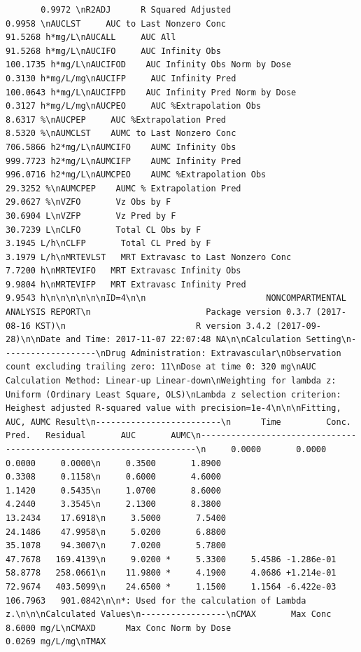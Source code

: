 \documentclass[12pt,]{krantz}
\theoremstyle{definition}
\theoremstyle{definition}
\theoremstyle{definition}
\theoremstyle{remark}
\begin{document}
\begin{verbatim}
       0.9972 \nR2ADJ      R Squared Adjusted                              0.9958 \nAUCLST     AUC to Last Nonzero Conc                       91.5268 h*mg/L\nAUCALL     AUC All                                        91.5268 h*mg/L\nAUCIFO     AUC Infinity Obs                              100.1735 h*mg/L\nAUCIFOD    AUC Infinity Obs Norm by Dose                   0.3130 h*mg/L/mg\nAUCIFP     AUC Infinity Pred                             100.0643 h*mg/L\nAUCIFPD    AUC Infinity Pred Norm by Dose                  0.3127 h*mg/L/mg\nAUCPEO     AUC %Extrapolation Obs                          8.6317 %\nAUCPEP     AUC %Extrapolation Pred                         8.5320 %\nAUMCLST    AUMC to Last Nonzero Conc                     706.5866 h2*mg/L\nAUMCIFO    AUMC Infinity Obs                             999.7723 h2*mg/L\nAUMCIFP    AUMC Infinity Pred                            996.0716 h2*mg/L\nAUMCPEO    AUMC %Extrapolation Obs                        29.3252 %\nAUMCPEP    AUMC % Extrapolation Pred                      29.0627 %\nVZFO       Vz Obs by F                                    30.6904 L\nVZFP       Vz Pred by F                                   30.7239 L\nCLFO       Total CL Obs by F                               3.1945 L/h\nCLFP       Total CL Pred by F                              3.1979 L/h\nMRTEVLST   MRT Extravasc to Last Nonzero Conc              7.7200 h\nMRTEVIFO   MRT Extravasc Infinity Obs                      9.9804 h\nMRTEVIFP   MRT Extravasc Infinity Pred                     9.9543 h\n\n\n\n\n\nID=4\n\n                        NONCOMPARTMENTAL ANALYSIS REPORT\n                       Package version 0.3.7 (2017-08-16 KST)\n                          R version 3.4.2 (2017-09-28)\n\nDate and Time: 2017-11-07 22:07:48 NA\n\nCalculation Setting\n-------------------\nDrug Administration: Extravascular\nObservation count excluding trailing zero: 11\nDose at time 0: 320 mg\nAUC Calculation Method: Linear-up Linear-down\nWeighting for lambda z: Uniform (Ordinary Least Square, OLS)\nLambda z selection criterion: Heighest adjusted R-squared value with precision=1e-4\n\n\nFitting, AUC, AUMC Result\n-------------------------\n      Time         Conc.      Pred.   Residual       AUC       AUMC\n---------------------------------------------------------------------\n     0.0000       0.0000                           0.0000     0.0000\n     0.3500       1.8900                           0.3308     0.1158\n     0.6000       4.6000                           1.1420     0.5435\n     1.0700       8.6000                           4.2440     3.3545\n     2.1300       8.3800                          13.2434    17.6918\n     3.5000       7.5400                          24.1486    47.9958\n     5.0200       6.8800                          35.1078    94.3007\n     7.0200       5.7800                          47.7678   169.4139\n     9.0200 *     5.3300     5.4586 -1.286e-01    58.8778   258.0661\n    11.9800 *     4.1900     4.0686 +1.214e-01    72.9674   403.5099\n    24.6500 *     1.1500     1.1564 -6.422e-03   106.7963   901.0842\n\n*: Used for the calculation of Lambda z.\n\n\nCalculated Values\n-----------------\nCMAX       Max Conc                                        8.6000 mg/L\nCMAXD      Max Conc Norm by Dose                           0.0269 mg/L/mg\nTMAX       
\end{verbatim}
\end{document}
